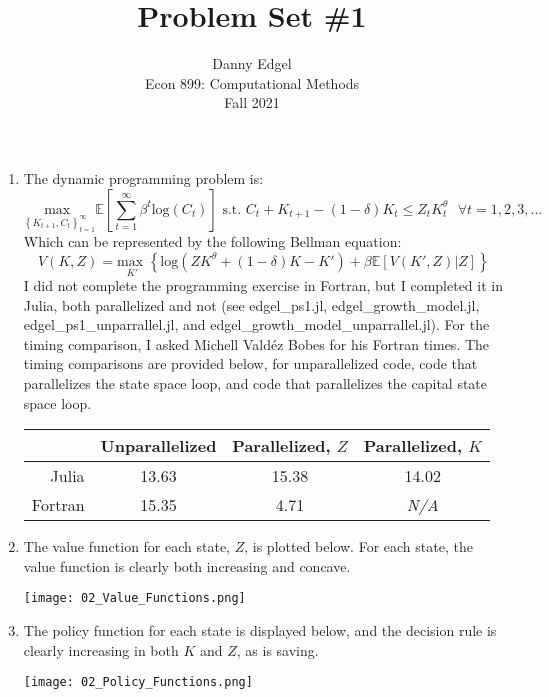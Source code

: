 \documentclass{article}
\newcommand{\loge}[1]{\text{log}\left(#1\right)}
\newcommand{\usmax}[1]{\underset{#1}{\text{max }}}
\newcommand{\E}[1]{\mathbb{E}\left[#1\right]} %
\begin{document}
\title{	Problem Set \#1 }
\author{ 		Danny Edgel 						\\ 
			Econ 899: Computational Methods		\\
			Fall 2021						\\
		}
\maketitle\thispagestyle{empty}



\begin{enumerate}
	\item The dynamic programming problem is:
	\[
		\usmax{\left\{K_{t+1}, C_t\right\}_{t=1}^\infty}\E{\sum_{t=1}^\infty\beta^t\loge{C_t}}
			\text{ s.t. }C_t + K_{t+1} - (1-\delta)K_t\leq Z_tK_t^\theta\text{ }\forall t = 1,2,3,...
	\]
	Which can be represented by the following Bellman equation:
	\[
		V(K,Z) = \usmax{K'}\left\{\loge{ZK^\theta + (1-\delta)K - K'} + \beta\E{V(K', Z)|Z}\right\}
	\]
	I did not complete the programming exercise in Fortran, but I completed it in Julia, both parallelized and not (see edgel\_ps1.jl, edgel\_growth\_model.jl, edgel\_ps1\_unparrallel.jl, and edgel\_growth\_model\_unparrallel.jl). For the timing comparison, I asked Michell Vald\'{e}z Bobes for his Fortran times. The timing comparisons are provided below, for unparallelized code, code that parallelizes the state space loop, and code that parallelizes the capital state space loop.
	\begin{center}
		\begin{tabular}{r|ccc}
					& Unparallelized	& Parallelized, $Z$	& Parallelized, $K$	\\\hline
			Julia		& 13.63		& 15.38		& 14.02		\\
			Fortran 	& 15.35		& 4.71		& \textit{N/A}
		\end{tabular}
	\end{center}
	
	\item The value function for each state, $Z$, is plotted below. For each state, the value function is clearly both increasing and concave.
	\begin{center}
		\texttt{[image: 02\_Value\_Functions.png]}
	\end{center}
	
	\item The policy function for each state is displayed below, and the decision rule is clearly increasing in both $K$ and $Z$, as is saving.
	\begin{center}
		\texttt{[image: 02\_Policy\_Functions.png]}
	\end{center}
	
\end{enumerate}

\end{document}
